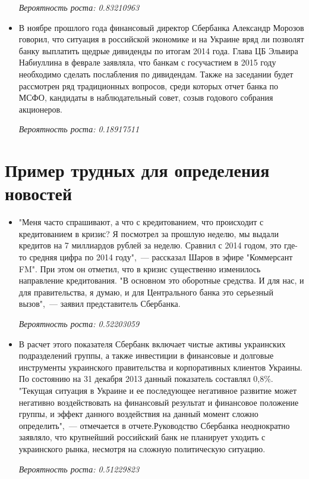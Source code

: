 \documentclass[14pt]{matmex-diploma-custom}
\begin{document}
\begin{appendices}
\begin{itemize}
\emph{Вероятность роста: 0.83210963}

\item В ноябре прошлого года финансовый директор Сбербанка Александр Морозов говорил, что ситуация в российской экономике и на Украине вряд ли позволят банку выплатить щедрые дивиденды по итогам 2014 года. Глава ЦБ Эльвира Набиуллина в феврале заявляла, что банкам с госучастием в 2015 году необходимо сделать послабления по дивидендам. Также на заседании будет рассмотрен ряд традиционных вопросов, среди которых отчет банка по МСФО, кандидаты в наблюдательный совет, созыв годового собрания акционеров.

\emph{Вероятность роста: 0.18917511}
\end{itemize}

\section{Пример трудных для определения новостей}

\label{news:bad}

\begin{itemize}
\item "Меня часто спрашивают, а что с кредитованием, что происходит с кредитованием в кризис? Я посмотрел за прошлую неделю, мы выдали кредитов на 7 миллиардов рублей за неделю. Сравнил с 2014 годом, это где-то средняя цифра по 2014 году",~--- рассказал Шаров в эфире "Коммерсант FM". При этом он отметил, что в кризис существенно изменилось направление кредитования. "В основном это оборотные средства. И для нас, и для правительства, я думаю, и для Центрального банка это серьезный вызов",~--- заявил представитель Сбербанка. 

\emph{Вероятность роста: 0.52203059}

\item В расчет этого показателя Сбербанк включает чистые активы украинских подразделений группы, а также инвестиции в финансовые и долговые инструменты украинского правительства и корпоративных клиентов Украины. По состоянию на 31 декабря 2013 данный показатель составлял 0,8\%. "Текущая ситуация в Украине и ее последующее негативное развитие может негативно воздействовать на финансовый результат и финансовое положение группы, и эффект данного воздействия на данный момент сложно определить",~--- отмечается в отчете.Руководство Сбербанка неоднократно заявляло, что крупнейший российский банк не планирует уходить с украинского рынка, несмотря на сложную политическую ситуацию.

\emph{Вероятность роста: 0.51229823}
\end{itemize}

\end{appendices}
\end{document}
